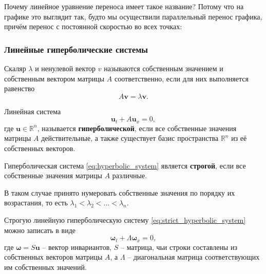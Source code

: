 \documentclass[../main.tex]{subfile}
\begin{document}
Почему линейное уравнение переноса имеет такое название? Потому что на графике
это выглядит так, будто мы осуществили параллельный перенос графика, причём
перенос с постоянной скоростью во всех точках: \\



\subsubsection{Линейные гиперболические системы}
\begin{define}
	Скаляр $\lambda$ и ненулевой вектор $v$ называются собственным
	значением и собственным вектором матрицы $A$ соответственно, если для
	них выполняется равенство
	\[A\boldsymbol v=\lambda \boldsymbol v.\]
\end{define}

\begin{define}\label{eq:hyperbolic_system}
	Линейная система \[\boldsymbol u_t+A\boldsymbol u_x=0,\]
	где $\boldsymbol u\in \mathbb R^n$, называется
	\textbf{гиперболической}, если все собственные значения матрицы $A$
	действительные, а также существует базис пространства $\mathbb R^n$
	из её собственных векторов.
\end{define}

\begin{define}\label{eq:strict_hyperbolic_system}
	Гиперболическая система \eqref{eq:hyperbolic_system} является
	\textbf{строгой}, если все собственные значения матрицы $A$ различные.
\end{define}

В таком случае принято нумеровать собственные значения по порядку их
возрастания, то есть $\lambda_1<\lambda_2<...<\lambda_n$.

\begin{lemma}\label{eq:hyperbolic_invariant_form}
	Строгую линейную гиперболическую систему
	\eqref{eq:strict_hyperbolic_system} можно записать в виде
	\[\boxed{\boldsymbol\omega_t+\Lambda\boldsymbol\omega_x=0},\]
	где $\boldsymbol\omega=S\boldsymbol u$ -- вектор инвариантов, $S$ --
	матрица, чьи строки составлены из собственных векторов матрицы $A$,
	а $\Lambda$ -- диагональная матрица соответствующих им собственных
	значений.
\end{lemma}
\end{document}
